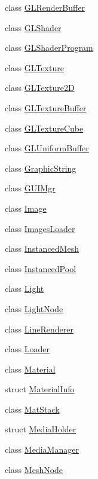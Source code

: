 \begin{DoxyCompactItemize}
class \hyperlink{class_agmd_1_1_g_l_render_buffer}{G\+L\+Render\+Buffer}
\item 
class \hyperlink{class_agmd_1_1_g_l_shader}{G\+L\+Shader}
\item 
class \hyperlink{class_agmd_1_1_g_l_shader_program}{G\+L\+Shader\+Program}
\item 
class \hyperlink{class_agmd_1_1_g_l_texture}{G\+L\+Texture}
\item 
class \hyperlink{class_agmd_1_1_g_l_texture2_d}{G\+L\+Texture2\+D}
\item 
class \hyperlink{class_agmd_1_1_g_l_texture_buffer}{G\+L\+Texture\+Buffer}
\item 
class \hyperlink{class_agmd_1_1_g_l_texture_cube}{G\+L\+Texture\+Cube}
\item 
class \hyperlink{class_agmd_1_1_g_l_uniform_buffer}{G\+L\+Uniform\+Buffer}
\item 
class \hyperlink{class_agmd_1_1_graphic_string}{Graphic\+String}
\item 
class \hyperlink{class_agmd_1_1_g_u_i_mgr}{G\+U\+I\+Mgr}
\item 
class \hyperlink{class_agmd_1_1_image}{Image}
\item 
class \hyperlink{class_agmd_1_1_images_loader}{Images\+Loader}
\item 
class \hyperlink{class_agmd_1_1_instanced_mesh}{Instanced\+Mesh}
\item 
class \hyperlink{class_agmd_1_1_instanced_pool}{Instanced\+Pool}
\item 
class \hyperlink{class_agmd_1_1_light}{Light}
\item 
class \hyperlink{class_agmd_1_1_light_node}{Light\+Node}
\item 
class \hyperlink{class_agmd_1_1_line_renderer}{Line\+Renderer}
\item 
class \hyperlink{class_agmd_1_1_loader}{Loader}
\item 
class \hyperlink{class_agmd_1_1_material}{Material}
\item 
struct \hyperlink{struct_agmd_1_1_material_info}{Material\+Info}
\item 
class \hyperlink{class_agmd_1_1_mat_stack}{Mat\+Stack}
\item 
struct \hyperlink{struct_agmd_1_1_media_holder}{Media\+Holder}
\item 
class \hyperlink{class_agmd_1_1_media_manager}{Media\+Manager}
\item 
class \hyperlink{class_agmd_1_1_mesh_node}{Mesh\+Node}
\item 

\end{DoxyCompactItemize}
